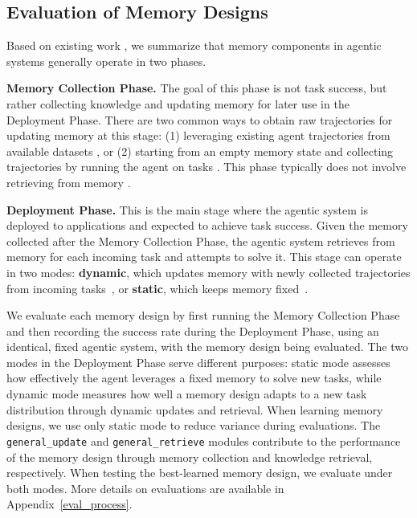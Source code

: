 \documentclass{article}
\theoremstyle{plain}
\theoremstyle{definition}
\theoremstyle{remark}
\begin{document}
\subsection{Evaluation of Memory Designs} %
\label{memory eval}
Based on existing work \citep{nan2025nemori, chhikara2025mem0, ouyang2025reasoningbank, zhang2025g, tang2025agent, suzgun2025DynamicCheatsheet, hu2025memory, wang2024agent, Zhong2024MemoryBank, packer2023memgpt, fang2025memp, zhaoExpeL2024}, we summarize that memory components in agentic systems generally operate in two phases.

\noindent\textbf{Memory Collection Phase.}\hspace{0.5em}
The goal of this phase is not task success, but rather collecting knowledge and updating memory for later use in the Deployment Phase. There are two common ways to obtain raw trajectories for updating memory at this stage: (1) leveraging existing agent trajectories from available datasets \citep{Zhong2024MemoryBank, chhikara2025mem0}, or (2) starting from an empty memory state and collecting trajectories by running the agent on tasks \citep{fang2025memp, tang2025agent}. This phase typically does not involve retrieving from memory \citep{Zhong2024MemoryBank, chhikara2025mem0, wang2024agent, packer2023memgpt, rasmussen2025zep}.

\noindent\textbf{Deployment Phase.}\hspace{0.5em}
This is the main stage where the agentic system is deployed to applications and expected to achieve task success. Given the memory collected after the Memory Collection Phase, the agentic system retrieves from memory for each incoming task and attempts to solve it. This stage can operate in two modes: \textbf{dynamic}, which updates memory with newly collected trajectories from incoming tasks~\citep{zhang2025g, ouyang2025reasoningbank}, or \textbf{static}, which keeps memory fixed~\citep{tang2025agent, rasmussen2025zep}.

We evaluate each memory design by first running the Memory Collection Phase and then recording the success rate during the Deployment Phase, using an identical, fixed agentic system, with the memory design being evaluated. The two modes in the Deployment Phase serve different purposes: static mode assesses how effectively the agent leverages a fixed memory to solve new tasks, while dynamic mode measures how well a memory design adapts to a new task distribution through dynamic updates and retrieval. When learning memory designs, we use only static mode to reduce variance during evaluations. The \texttt{general\_update} and \texttt{general\_retrieve} modules contribute to the performance of the memory design through memory collection and knowledge retrieval, respectively. When testing the best-learned memory design, we evaluate under both modes.
More details on evaluations are available in Appendix~\ref{eval_process}.
\vspace{-0.5em}
\end{document}
